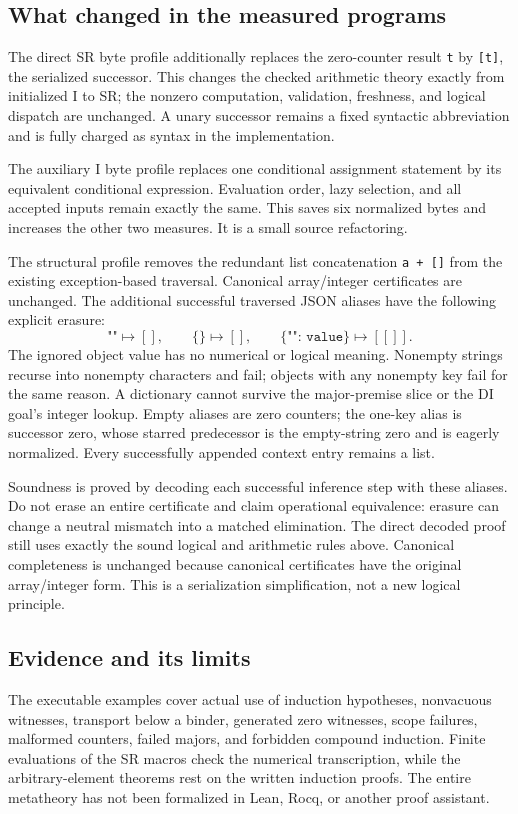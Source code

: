 \subsection{What changed in the measured programs}

The direct SR byte profile additionally replaces the zero-counter
result \texttt{t} by \texttt{[t]}, the serialized successor. This changes
the checked arithmetic theory exactly from initialized I to SR; the
nonzero computation, validation, freshness, and logical dispatch are
unchanged. A unary successor remains a fixed syntactic abbreviation and
is fully charged as syntax in the implementation.

The auxiliary I byte profile replaces one conditional assignment statement by its
equivalent conditional expression. Evaluation order, lazy selection, and
all accepted inputs remain exactly the same. This saves six normalized
bytes and increases the other two measures. It is a small source refactoring.

The structural profile removes the redundant list concatenation
\texttt{a + []} from the existing exception-based traversal. Canonical
array/integer certificates are unchanged. The additional successful
traversed JSON aliases have the following explicit erasure:
\[
 \texttt{""}\mapsto[],\qquad \texttt{\{\}}\mapsto[],\qquad
 \texttt{\{"": value\}}\mapsto[[]].
\]
The ignored object value has no numerical or logical meaning. Nonempty
strings recurse into nonempty characters and fail; objects with any
nonempty key fail for the same reason. A dictionary cannot survive the
major-premise slice or the DI goal's integer lookup. Empty aliases are
zero counters; the one-key alias is successor zero, whose starred
predecessor is the empty-string zero and is eagerly normalized.
Every successfully appended context entry remains a list.

Soundness is proved by decoding each successful inference step with
these aliases. Do not erase an entire certificate and claim operational
equivalence: erasure can change a neutral mismatch into a matched
elimination. The direct decoded proof still uses exactly the sound
logical and arithmetic rules above. Canonical completeness is unchanged
because canonical certificates have the original array/integer form.
This is a serialization simplification, not a new logical principle.



\subsection{Evidence and its limits}


The executable examples cover actual use of induction hypotheses,
nonvacuous witnesses, transport below a binder, generated zero witnesses,
scope failures, malformed counters, failed majors, and forbidden compound
induction. Finite evaluations of the SR macros check the numerical
transcription, while the arbitrary-element theorems rest on the written
induction proofs. The entire metatheory has not been formalized in Lean,
Rocq, or another proof assistant.
